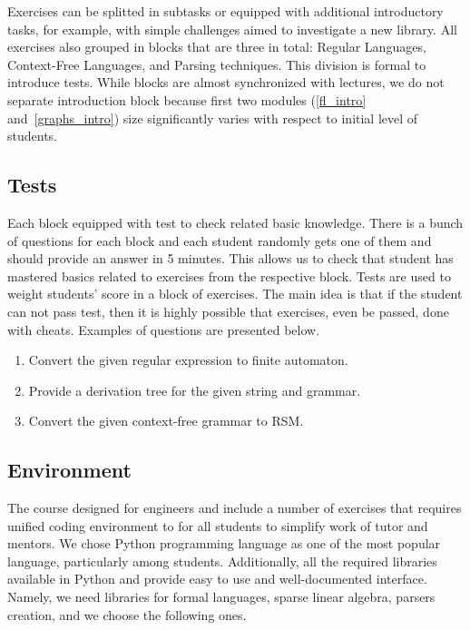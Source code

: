 \documentclass[sigconf]{acmart}
\begin{document}
Exercises can be splitted in subtasks or equipped with additional introductory tasks, for example, with simple challenges aimed to investigate a new library.
All exercises also grouped in blocks that are three in total: Regular Languages, Context-Free Languages, and Parsing techniques.
This division is formal to introduce tests.
While blocks are almost synchronized with lectures, we do not separate introduction block because first two modules (\ref{fl_intro} and~\ref{graphs_intro}) size significantly varies with respect to initial level of students.


\subsection{Tests}

Each block equipped with test to check related basic knowledge.
There is a bunch of questions for each block and each student randomly gets one of them and should provide an answer in 5 minutes. 
This allows us to check that student has mastered basics related to exercises from the respective block.
Tests are used to weight students' score in a block of exercises. 
The main idea is that if the student can not pass test, then it is highly possible that exercises, even be passed, done with cheats.
Examples of questions are presented below.
\begin{enumerate}
   \item Convert the given regular expression to finite automaton.
   \item Provide a derivation tree for the given string and grammar.
   \item Convert the given context-free grammar to RSM.
\end{enumerate}


\subsection{Environment}

The course designed for engineers and include a number of exercises that requires unified coding environment to for all students to simplify work of tutor and mentors.
We chose Python programming language as one of the most popular language, particularly among students.
Additionally, all the required libraries available in Python and provide easy to use and well-documented interface.
Namely, we need libraries for formal languages, sparse linear algebra, parsers creation, and we choose the following ones.
\end{document}
